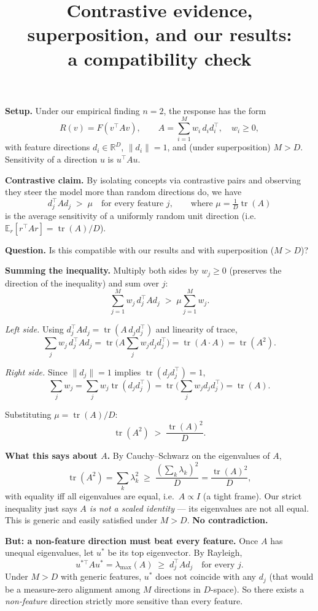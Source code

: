 \documentclass[11pt]{article}
\title{Contrastive evidence, superposition, and our results:\\ a compatibility check}
\date{}
\DeclareMathOperator{\tr}{tr}
\begin{document}
\maketitle

\noindent\textbf{Setup.} Under our empirical finding $n=2$, the response has the form
\[
R(v) = F(v^\top A v), \qquad A = \sum_{i=1}^M w_i\, d_i d_i^\top, \quad w_i \geq 0,
\]
with feature directions $d_i \in \mathbb{R}^D$, $\|d_i\|=1$, and (under superposition) $M > D$. Sensitivity of a direction $u$ is $u^\top A u$.

\medskip
\noindent\textbf{Contrastive claim.} By isolating concepts via contrastive pairs and observing they steer the model more than random directions do, we have
\[
d_j^\top A d_j \;>\; \mu \quad \text{for every feature } j, \qquad \text{where } \mu = \tfrac{1}{D}\tr(A)
\]
is the average sensitivity of a uniformly random unit direction (i.e.\ $\mathbb{E}_r [r^\top A r] = \tr(A)/D$).

\medskip
\noindent\textbf{Question.} Is this compatible with our results and with superposition ($M > D$)?

\medskip
\noindent\textbf{Summing the inequality.} Multiply both sides by $w_j \geq 0$ (preserves the direction of the inequality) and sum over $j$:
\[
\sum_{j=1}^M w_j\, d_j^\top A d_j \;>\; \mu \sum_{j=1}^M w_j.
\]

\smallskip
\noindent\emph{Left side.} Using $d_j^\top A d_j = \tr(A\, d_j d_j^\top)$ and linearity of trace,
\[
\sum_j w_j\, d_j^\top A d_j
= \tr\!\Big(A \sum_j w_j d_j d_j^\top\Big)
= \tr(A \cdot A)
= \tr(A^2).
\]

\smallskip
\noindent\emph{Right side.} Since $\|d_j\|=1$ implies $\tr(d_j d_j^\top) = 1$,
\[
\sum_j w_j = \sum_j w_j \tr(d_j d_j^\top) = \tr\!\Big(\sum_j w_j d_j d_j^\top\Big) = \tr(A).
\]

\smallskip
Substituting $\mu = \tr(A)/D$:
\[
\boxed{\tr(A^2) \;>\; \frac{\tr(A)^2}{D}.}
\]

\medskip
\noindent\textbf{What this says about $A$.} By Cauchy--Schwarz on the eigenvalues of $A$,
\[
\tr(A^2) = \sum_k \lambda_k^2 \;\geq\; \frac{(\sum_k \lambda_k)^2}{D} = \frac{\tr(A)^2}{D},
\]
with equality iff all eigenvalues are equal, i.e.\ $A \propto I$ (a tight frame). Our strict inequality just says \emph{$A$ is not a scaled identity} --- its eigenvalues are not all equal. This is generic and easily satisfied under $M > D$. \textbf{No contradiction.}

\medskip
\noindent\textbf{But: a non-feature direction must beat every feature.} Once $A$ has unequal eigenvalues, let $u^*$ be its top eigenvector. By Rayleigh,
\[
u^{*\top} A u^* = \lambda_{\max}(A) \;\geq\; d_j^\top A d_j \quad \text{for every } j.
\]
Under $M > D$ with generic features, $u^*$ does not coincide with any $d_j$ (that would be a measure-zero alignment among $M$ directions in $D$-space). So there exists a \emph{non-feature} direction strictly more sensitive than every feature.
\end{document}
